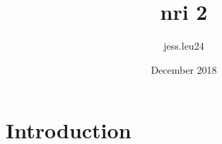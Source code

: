 \documentclass{article}
\title{nri 2}
\author{jess.leu24 }
\date{December 2018}
\begin{document}
\maketitle

\section{Introduction}
\end{document}
